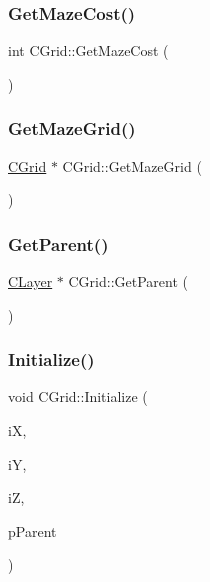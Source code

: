 \mbox{\label{classCGrid_aba82d88e217d71278fce3d7ed35a9b03}} 
\subsubsection{\texorpdfstring{GetMazeCost()}{GetMazeCost()}}
{\footnotesize\ttfamily int C\+Grid\+::\+Get\+Maze\+Cost (\begin{DoxyParamCaption}{ }\end{DoxyParamCaption})\hspace{0.3cm}{\ttfamily [inline]}}

\mbox{\label{classCGrid_a49c151fb13b2fa36acb3530a8d477893}} 
\subsubsection{\texorpdfstring{GetMazeGrid()}{GetMazeGrid()}}
{\footnotesize\ttfamily \mbox{\hyperlink{classCGrid}{C\+Grid}} $\ast$ C\+Grid\+::\+Get\+Maze\+Grid (\begin{DoxyParamCaption}{ }\end{DoxyParamCaption})\hspace{0.3cm}{\ttfamily [inline]}}

\mbox{\label{classCGrid_af44b06db6a18bd3ae28cc4cfecfeb396}} 
\subsubsection{\texorpdfstring{GetParent()}{GetParent()}}
{\footnotesize\ttfamily \mbox{\hyperlink{classCLayer}{C\+Layer}} $\ast$ C\+Grid\+::\+Get\+Parent (\begin{DoxyParamCaption}{ }\end{DoxyParamCaption})}

\mbox{\label{classCGrid_ac56d94ad7df38d3908ff3b12670d9812}} 
\subsubsection{\texorpdfstring{Initialize()}{Initialize()}}
{\footnotesize\ttfamily void C\+Grid\+::\+Initialize (\begin{DoxyParamCaption}\item[{int}]{iX,  }\item[{int}]{iY,  }\item[{int}]{iZ,  }\item[{\mbox{\hyperlink{classCLayer}{C\+Layer}} $\ast$}]{p\+Parent }\end{DoxyParamCaption})\hspace{0.3cm}{\ttfamily [virtual]}}



